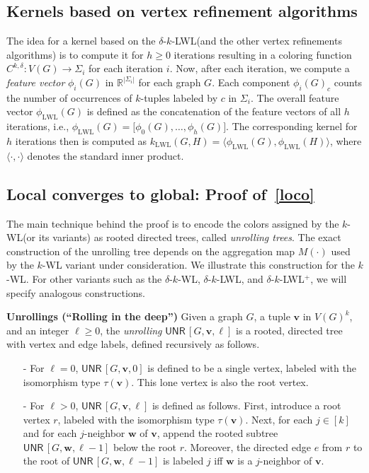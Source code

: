 \documentclass{article}
\newcommand{\xhdr}[1]{{\noindent\bfseries #1}}
\theoremstyle{definition}
\newcommand{\new}[1]{\emph{#1}}
\newcommand{\bbR}{\ensuremath{\mathbb{R}}}
\renewcommand{\vec}[1]{\mathbf{#1}}
\newcommand{\kwl}{$k$-\textsf{WL}\xspace}
\newcommand{\deltakwl}{$\delta$-$k$-\textsf{WL}\xspace}
\newcommand{\localkwl}{$\delta$-$k$-\textsf{LWL}\xspace}
\newcommand{\pluskwl}{$\delta$-$k$-\textsf{LWL}$^+$\xspace}
\newcommand{\UNR}{\textsf{UNR}\,}
\begin{document}
\subsection{Kernels based on vertex refinement algorithms}

The idea for a kernel based on the \localkwl (and the other vertex refinements algorithms) is to compute it for $h \geq 0$ iterations resulting in a coloring function $C^{k,\delta} \colon V(G) \to \Sigma_i$ for each iteration $i$. Now, after each iteration, we compute a \new{feature vector} $\phi_i(G)$ in $\bbR^{|\Sigma_i|}$ for each graph $G$. Each component $\phi_i(G)_{c}$ counts the number of occurrences of $k$-tuples labeled by $c$ in $\Sigma_i$. The overall feature vector $\phi_{\text{LWL}}(G)$ is defined as the concatenation of the feature vectors of all $h$ iterations, i.e., $\phi_{\text{LWL}}(G) = \big[\phi_0(G), \dots, \phi_h(G) \big]$. The corresponding kernel for $h$ iterations then is computed as  $k_{\text{LWL}}(G,H) = \langle \phi_{\text{LWL}}(G), \phi_{\text{LWL}}(H) \rangle$, where $\langle \cdot, \cdot \rangle$ denotes the standard inner product.

\subsection{Local converges to global: Proof of~\cref{loco}}\label{locodes}

The main technique behind the proof is to encode the colors assigned by the \kwl (or its variants) as rooted directed trees, called \emph{unrolling trees}. 
The exact construction of the unrolling tree depends on the aggregation map $M(\cdot)$ used by the \kwl variant under consideration. 
We illustrate this construction for the \kwl. For other variants such as the \deltakwl, \localkwl, and \pluskwl, we will specify analogous constructions. 

\xhdr{Unrollings (``Rolling in the deep'')} Given a graph $G$, a tuple $\textbf{v}$ in $V(G)^k$, and an integer $\ell \geq 0$, 
the \emph{unrolling} $\UNR[G,\vec{v},\ell]$ is a rooted, directed tree with vertex and edge labels, defined recursively as follows. 
\begin{itemize}
	\item[-] For $\ell = 0$, $\UNR[G,\textbf{v},0]$ is defined to be a single vertex, labeled with the isomorphism type $\tau(\vec{v})$.  
	This lone vertex is also the root vertex.
	
	\item[-] For $\ell > 0$, $\UNR[G,\textbf{v},\ell]$ is defined as follows. 
	First, introduce a root vertex $r$, labeled with the isomorphism type $\tau(\vec{v})$.
	Next, for each $j \in [k]$ and for each $j$-neighbor $\vec{w}$ of $\vec{v}$, 
	append the rooted subtree $\UNR[G,\vec{w},\ell-1]$ below the root $r$. 
	Moreover, the directed edge $e$ from $r$ to the root of $\UNR[G,\vec{w},\ell-1]$ is labeled $j$ iff $\vec{w}$ is a $j$-neighbor of $\vec{v}$. 
	
\end{itemize}
\end{document}
